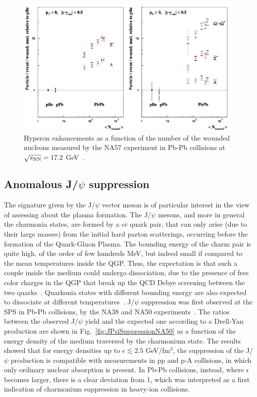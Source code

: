 \begin{figure}[!ht]
  \centering
  \includegraphics[width=12cm]{FigCap1/strangEnhancSPS.png}
  \caption{ Hyperon enhancements as a function of the number of the wounded nucleons measured by the NA57 experiment in Pb-Pb collisions at $\sqrt{s_{\rm NN}} = 17.2$ GeV~\cite{Sandor:2004bg}.}
  \label{fig:sEnhancSPS}
\end{figure}

\subsection{Anomalous J/$\psi$ suppression}
\label{sec:JPsiSuppression}
The signature given by the J/$\psi$ vector meson is of particular interest
in the view of assessing about the plasma formation.
The J/$\psi$ mesons, and more in general the charmonia states, are formed by a $c\bar{c}$ quark pair, that can only arise (due to their large masses) from the initial hard parton scatterings, occurring before the formation of the Quark-Gluon Plasma. The bounding energy of the charm pair is quite high, of the order of few hundreds MeV, but indeed small if compared to the mean temperatures inside the QGP. Thus, the expectation is that such a couple inside the medium could undergo dissociation, due to the presence of free color charges in the QGP that break up the QCD Debye screening between the two quarks~\cite{Abreu:2000ni}. Quarkonia states with different bounding energy are also expected to dissociate at different temperatures~\cite{Digal:2001ue}.
J/$\psi$ suppression was first observed at the SPS in Pb-Pb collisions, by the NA38 and NA50 experiments~\cite{Abreu:2000ni}.
The ratios between the observed J/$\psi$ yield and the expected one according to a Drell-Yan production are shown in Fig.~\ref{fig:JPsiSuppressionNA50} as a function of the energy density of the medium traversed by the charmonium state. The results showed that for energy densities up to $\epsilon \lesssim 2.5$ GeV/fm$^3$, 
the suppression of the J/$\psi$ production is compatible with measurements in pp and p-A collisions, in which only ordinary nuclear absorption is present. In Pb-Pb collisions, instead, where $\epsilon$ becomes larger, there is a clear deviation from 1, which was interpreted as a first indication of charmonium suppression in heavy-ion collisions.

